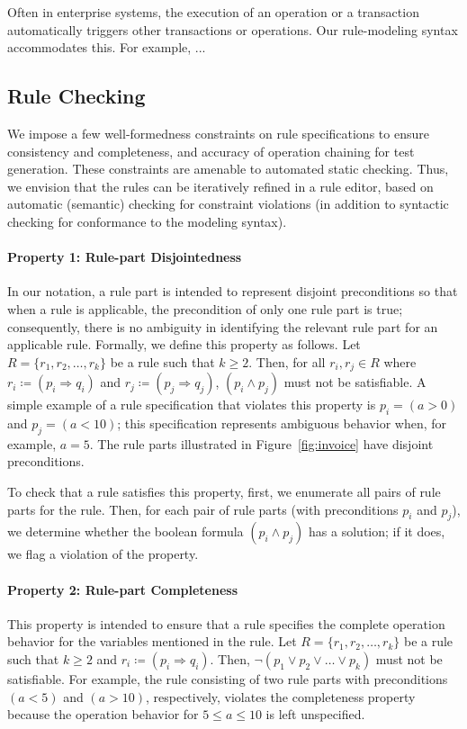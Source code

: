 Often in enterprise systems, the execution of an operation or a transaction
automatically triggers other transactions or operations. Our rule-modeling
syntax accommodates this. For example, ...

\subsection{Rule Checking}
 
We impose a few well-formedness constraints on rule specifications to ensure
consistency and completeness, and accuracy of operation chaining for test
generation. These constraints are amenable to automated static checking. Thus,
we envision that the rules can be iteratively refined in a rule editor, based on
automatic (semantic) checking for constraint violations (in addition to
syntactic checking for conformance to the modeling syntax).

\paragraph*{Property 1: Rule-part Disjointedness}
In our notation, a rule part is intended to represent disjoint preconditions so
that when a rule is applicable, the precondition of only one rule part is true;
consequently, there is no ambiguity in identifying the relevant rule part for an
applicable rule. Formally, we define this property as follows. Let $R= \{r_1,
r_2, \ldots, r_k\}$ be a rule such that $k \geq 2$. Then, for all $r_i, r_j \in
R$ where $ r_i \coloneqq (p_i \Longrightarrow q_i)$ and $r_j \coloneqq (p_j
\Longrightarrow q_j)$, $(p_i \wedge p_j)$ must not be satisfiable. A simple
example of a rule specification that violates this property is $p_i = (a > 0)$
and $p_j = (a < 10)$; this specification represents ambiguous behavior when, for
example, $a = 5$.  The rule parts illustrated in Figure~\ref{fig:invoice} have
disjoint preconditions.

To check that a rule satisfies this property, first, we enumerate all pairs of
rule parts for the rule. Then, for each pair of rule parts (with preconditions
$p_i$ and $p_j$), we determine whether the boolean formula $(p_i \wedge p_j)$
has a solution; if it does, we flag a violation of the property.

\paragraph*{Property 2: Rule-part Completeness}
This property is intended to ensure that a rule specifies the complete operation
behavior for the variables mentioned in the rule. Let $R= \{r_1, r_2, \ldots,
r_k\}$ be a rule such that $k \geq 2$ and $r_i \coloneqq (p_i \Longrightarrow
q_i)$. Then, $\neg(p_1 \vee p_2 \vee \ldots \vee p_k)$ must not be
satisfiable. For example, the rule consisting of two rule parts with
preconditions $(a < 5)$ and $(a > 10)$, respectively, violates the completeness
property because the operation behavior for $5 \leq a \leq 10$ is left
unspecified.

